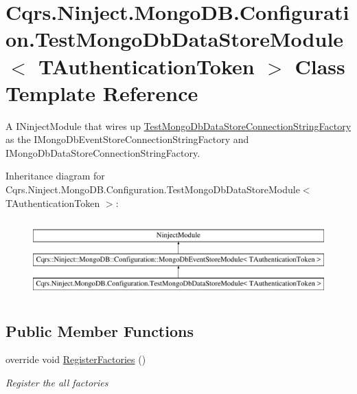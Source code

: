 \hypertarget{classCqrs_1_1Ninject_1_1MongoDB_1_1Configuration_1_1TestMongoDbDataStoreModule}{}\section{Cqrs.\+Ninject.\+Mongo\+D\+B.\+Configuration.\+Test\+Mongo\+Db\+Data\+Store\+Module$<$ T\+Authentication\+Token $>$ Class Template Reference}
\label{classCqrs_1_1Ninject_1_1MongoDB_1_1Configuration_1_1TestMongoDbDataStoreModule}


A I\+Ninject\+Module that wires up \hyperlink{classCqrs_1_1Ninject_1_1MongoDB_1_1TestMongoDbDataStoreConnectionStringFactory}{Test\+Mongo\+Db\+Data\+Store\+Connection\+String\+Factory} as the I\+Mongo\+Db\+Event\+Store\+Connection\+String\+Factory and I\+Mongo\+Db\+Data\+Store\+Connection\+String\+Factory.  


Inheritance diagram for Cqrs.\+Ninject.\+Mongo\+D\+B.\+Configuration.\+Test\+Mongo\+Db\+Data\+Store\+Module$<$ T\+Authentication\+Token $>$\+:\begin{figure}[H]
\begin{center}
\leavevmode
\includegraphics[height=3.000000cm]{classCqrs_1_1Ninject_1_1MongoDB_1_1Configuration_1_1TestMongoDbDataStoreModule}
\end{center}
\end{figure}
\subsection*{Public Member Functions}
\begin{DoxyCompactItemize}
\item 
override void \hyperlink{classCqrs_1_1Ninject_1_1MongoDB_1_1Configuration_1_1TestMongoDbDataStoreModule_abff300412dc5c2602db5f51925204c6e_abff300412dc5c2602db5f51925204c6e}{Register\+Factories} ()
\begin{DoxyCompactList}\small\item\em Register the all factories \end{DoxyCompactList}\end{DoxyCompactItemize}
